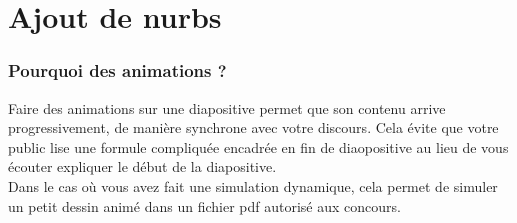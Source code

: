 \section{Ajout de nurbs}

\begin{frame}
  \frametitle{Pourquoi des animations ?}
  
  \begin{itemize}
   \flch Faire des animations sur une diapositive permet que son contenu arrive progressivement, de manière synchrone avec votre discours.
  Cela évite que votre public lise une formule compliquée encadrée en fin de diaopositive au lieu de vous écouter expliquer le début de la diapositive.\\
  \flch Dans le cas où vous avez fait une simulation dynamique, cela permet de simuler un petit dessin animé dans un fichier pdf autorisé aux concours.
  \end{itemize}
\end{frame}


